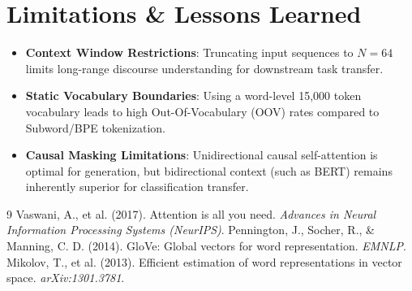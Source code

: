 \documentclass[10pt,twocolumn,3 authorization]{article}
\begin{document}
\section{Limitations \& Lessons Learned}
\begin{itemize}
    \item \textbf{Context Window Restrictions}: Truncating input sequences to $N=64$ limits long-range discourse understanding for downstream task transfer.
    \item \textbf{Static Vocabulary Boundaries}: Using a word-level 15,000 token vocabulary leads to high Out-Of-Vocabulary (OOV) rates compared to Subword/BPE tokenization.
    \item \textbf{Causal Masking Limitations}: Unidirectional causal self-attention is optimal for generation, but bidirectional context (such as BERT) remains inherently superior for classification transfer.
\end{itemize}

\begin{thebibliography}{9}
 Vaswani, A., et al. (2017). Attention is all you need. \textit{Advances in Neural Information Processing Systems (NeurIPS)}.
 Pennington, J., Socher, R., \& Manning, C. D. (2014). GloVe: Global vectors for word representation. \textit{EMNLP}.
 Mikolov, T., et al. (2013). Efficient estimation of word representations in vector space. \textit{arXiv:1301.3781}.
\end{thebibliography}
\end{document}

